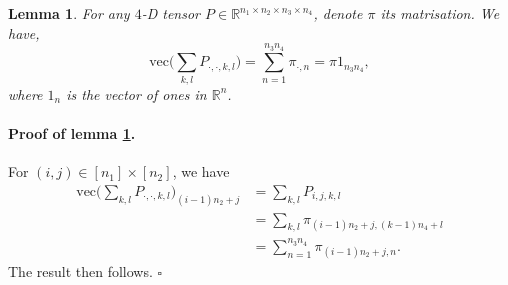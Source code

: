 \documentclass{article}
\newtheorem{lemma}[theorem]{Lemma}
\newcommand{\qed}{\hfill $\square$}
\begin{document}
\begin{lemma} \label{vec_mat}
  For any $4$-D tensor $P \in \mathbb R^{n_1 \times n_2 \times n_3 \times n_4}$, denote $\pi$ its matrisation. We have,
  \begin{equation*}
    \text{vec} \Big( \sum_{k,l} P_{\cdot, \cdot, k, l} \Big) = \sum_{n=1}^{n_3 n_4} \pi_{\cdot, n} = \pi 1_{n_3 n_4},
  \end{equation*}
  where $1_n$ is the vector of ones in $\mathbb R^n$.
\end{lemma}
\paragraph{Proof of lemma \ref{vec_mat}.} For $(i,j) \in [n_1] \times [n_2]$, we have
\begin{equation*}
  \begin{split}
    \text{vec}\Big(\sum_{k,l} P_{\cdot,\cdot, k, l}\Big)_{(i-1)n_2 + j} &= \sum_{k,l} P_{i,j,k,l} \\
    &= \sum_{k,l} \pi_{(i-1) n_2 + j, (k-1) n_4 + l} \\
    &= \sum_{n=1}^{n_3 n_4} \pi_{(i-1) n_2 + j, n}.
  \end{split}
\end{equation*}
The result then follows. \qed
\end{document}
